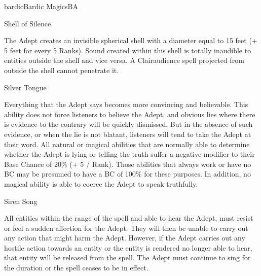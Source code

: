 \begin{college}[2.1]{bardic}{Bardic Magics}{BA}
\begin{spell}[S-10]{Shell of Silence}

\begin{effects}
The Adept creates an invisible spherical shell with a diameter equal
to 15 feet (+ 5 feet for every 5 Ranks). Sound created within this
shell is totally inaudible to entities outside the shell and vice
versa.  A Clairaudience spell projected from outside the shell cannot
penetrate it.
\end{effects}
\end{spell}

\begin{spell}[S-11]{Silver Tongue}

\begin{effects}
Everything that the Adept says becomes more convincing and believable.
This ability does not force listeners to believe the Adept, and
obvious lies where there is evidence to the contrary will be quickly
dismissed. But in the absence of such evidence, or when the lie is not
blatant, listeners will tend to take the Adept at their word. All
natural or magical abilities that are normally able to determine
whether the Adept is lying or telling the truth suffer a negative
modifier to their Base Chance of 20\% (+ 5 / Rank). Those abilities
that always work or have no BC may be presumed to have a BC of 100\%
for these purposes. In addition, no magical ability is able to coerce
the Adept to speak truthfully.
\end{effects}
\end{spell}

\begin{spell}[S-12]{Siren Song}

\begin{effects}
All entities within the range of the spell and able to hear the Adept,
must resist or feel a sudden affection for the Adept. They will then
be unable to carry out any action that might harm the Adept. However,
if the Adept carries out any hostile action towards an entity or the
entity is rendered no longer able to hear, that entity will be
released from the spell. The Adept must continue to sing for the
duration or the spell ceases to be in effect.
\end{effects}
\end{spell}


\end{college}
